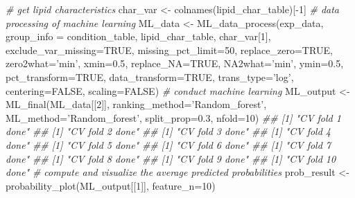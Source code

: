 \documentclass[]{article}
\newcommand{\hlnum}[1]{\textcolor[rgb]{0.816,0.125,0.439}{#1}}%
\newcommand{\hlstr}[1]{\textcolor[rgb]{0.251,0.627,0.251}{#1}}%
\newcommand{\hlcom}[1]{\textcolor[rgb]{0.502,0.502,0.502}{\textit{#1}}}%
\newcommand{\hlopt}[1]{\textcolor[rgb]{0,0,0}{#1}}%
\newcommand{\hlstd}[1]{\textcolor[rgb]{0.251,0.251,0.251}{#1}}%
\newcommand{\hlkwc}[1]{\textcolor[rgb]{0.251,0.251,0.251}{#1}}%
\newcommand{\hlkwd}[1]{\textcolor[rgb]{0.878,0.439,0.125}{#1}}%
\newenvironment{Shaded}{\begin{myshaded}}{\end{myshaded}}
\newcommand{\KeywordTok}[1]{\hlkwd{#1}}
\newcommand{\DataTypeTok}[1]{\hlkwc{#1}}
\newcommand{\DecValTok}[1]{\hlnum{#1}}
\newcommand{\FloatTok}[1]{\hlnum{#1}}
\newcommand{\StringTok}[1]{\hlstr{#1}}
\newcommand{\CommentTok}[1]{\hlcom{#1}}
\newcommand{\OtherTok}[1]{{#1}}
\newcommand{\OperatorTok}[1]{\hlopt{#1}}
\newcommand{\NormalTok}[1]{\hlstd{#1}}
\begin{document}
\begin{Shaded}
\begin{Highlighting}[]
\CommentTok{# get lipid characteristics}
\NormalTok{char_var <-}\StringTok{ }\KeywordTok{colnames}\NormalTok{(lipid_char_table)[}\OperatorTok{-}\DecValTok{1}\NormalTok{]}
\CommentTok{# data processing of machine learning}
\NormalTok{ML_data <-}\StringTok{ }\KeywordTok{ML_data_process}\NormalTok{(exp_data, }\DataTypeTok{group_info =}\NormalTok{ condition_table,}
\NormalTok{                           lipid_char_table, char_var[}\DecValTok{1}\NormalTok{],}
                           \DataTypeTok{exclude_var_missing=}\OtherTok{TRUE}\NormalTok{, }\DataTypeTok{missing_pct_limit=}\DecValTok{50}\NormalTok{,}
                           \DataTypeTok{replace_zero=}\OtherTok{TRUE}\NormalTok{, }\DataTypeTok{zero2what=}\StringTok{'min'}\NormalTok{, }\DataTypeTok{xmin=}\FloatTok{0.5}\NormalTok{,}
                           \DataTypeTok{replace_NA=}\OtherTok{TRUE}\NormalTok{, }\DataTypeTok{NA2what=}\StringTok{'min'}\NormalTok{, }\DataTypeTok{ymin=}\FloatTok{0.5}\NormalTok{,}
                           \DataTypeTok{pct_transform=}\OtherTok{TRUE}\NormalTok{, }\DataTypeTok{data_transform=}\OtherTok{TRUE}\NormalTok{,}
                           \DataTypeTok{trans_type=}\StringTok{'log'}\NormalTok{, }\DataTypeTok{centering=}\OtherTok{FALSE}\NormalTok{, }\DataTypeTok{scaling=}\OtherTok{FALSE}\NormalTok{)}
\CommentTok{# conduct machine learning}
\NormalTok{ML_output <-}\StringTok{ }\KeywordTok{ML_final}\NormalTok{(ML_data[[}\DecValTok{2}\NormalTok{]], }\DataTypeTok{ranking_method=}\StringTok{'Random_forest'}\NormalTok{,}
                      \DataTypeTok{ML_method=}\StringTok{'Random_forest'}\NormalTok{, }\DataTypeTok{split_prop=}\FloatTok{0.3}\NormalTok{, }\DataTypeTok{nfold=}\DecValTok{10}\NormalTok{)}
\CommentTok{## [1] "CV fold 1 done"}
\CommentTok{## [1] "CV fold 2 done"}
\CommentTok{## [1] "CV fold 3 done"}
\CommentTok{## [1] "CV fold 4 done"}
\CommentTok{## [1] "CV fold 5 done"}
\CommentTok{## [1] "CV fold 6 done"}
\CommentTok{## [1] "CV fold 7 done"}
\CommentTok{## [1] "CV fold 8 done"}
\CommentTok{## [1] "CV fold 9 done"}
\CommentTok{## [1] "CV fold 10 done"}
\CommentTok{# compute and visualize the average predicted probabilities}
\NormalTok{prob_result <-}\StringTok{ }\KeywordTok{probability_plot}\NormalTok{(ML_output[[}\DecValTok{1}\NormalTok{]], }\DataTypeTok{feature_n=}\DecValTok{10}\NormalTok{)}


\end{Highlighting}
\end{Shaded}
\end{document}
